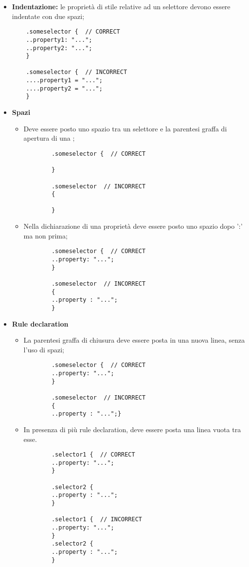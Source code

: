 \begin{itemize}
	\item{\textbf{Indentazione:} le proprietà di stile relative ad un selettore devono essere indentate con due spazi; 
	}
	\begin{lstlisting}
	.someselector {  // CORRECT
	..property1: "...";
	..property2: "...";
	}
	
	.someselector {  // INCORRECT
	....property1 = "...";
	....property2 = "...";
	}
	\end{lstlisting} 
	\item{\textbf{Spazi}}
	\begin{itemize}
		\item{Deve essere posto uno spazio tra un selettore e la parentesi graffa di apertura di una ;}
		\begin{lstlisting}
		.someselector {  // CORRECT
		
		}
		
		.someselector  // INCORRECT
		{  
		
		}
		\end{lstlisting}
		\item{Nella dichiarazione di una proprietà deve essere posto uno spazio dopo ':' ma non prima;}
		\begin{lstlisting}
		.someselector {  // CORRECT
		..property: "...";
		}
		
		.someselector  // INCORRECT
		{  
		..property : "...";
		}
		\end{lstlisting}
	\end{itemize}
	\item{\textbf{Rule declaration}}
	\begin{itemize}
		\item{La parentesi graffa di chiusura deve essere posta in una nuova linea, senza l'uso di spazi;}
		\begin{lstlisting}
		.someselector {  // CORRECT
		..property: "...";
		}
		
		.someselector  // INCORRECT
		{  
		..property : "...";}
		\end{lstlisting}
		
		\item{In presenza di più rule declaration, deve essere posta una linea vuota tra esse.}
		\begin{lstlisting}
		.selector1 {  // CORRECT
		..property: "...";
		}
		
		.selector2 {    
		..property : "...";
		}
		
		.selector1 {  // INCORRECT
		..property: "...";
		}
		.selector2 {    
		..property : "...";
		}
		\end{lstlisting}
	\end{itemize} 	
\end{itemize}

\pagebreak
